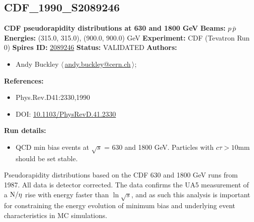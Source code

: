 \subsection[CDF\_1990\_S2089246]{CDF\_1990\_S2089246\,\cite{Abe:1989td}}
\textbf{CDF pseudorapidity distributions at 630 and 1800 GeV}\newline
\textbf{Beams:} $p$\,$\bar{p}$ \newline
\textbf{Energies:} (315.0, 315.0), (900.0, 900.0) GeV \newline
\textbf{Experiment:} CDF (Tevatron Run 0) \newline
\textbf{Spires ID:} \href{http://www.slac.stanford.edu/spires/find/hep/www?rawcmd=key+2089246}{2089246}\newline
\textbf{Status:} VALIDATED\newline
\textbf{Authors:}
\begin{itemize}
  \item Andy Buckley $\langle\,$\href{mailto:andy.buckley@cern.ch}{andy.buckley@cern.ch}$\,\rangle$;
\end{itemize}
\textbf{References:}
\begin{itemize}
  \item Phys.Rev.D41:2330,1990
  \item DOI: \href{http://dx.doi.org/10.1103/PhysRevD.41.2330}{10.1103/PhysRevD.41.2330}
\end{itemize}
\textbf{Run details:}
\begin{itemize}

  \item QCD min bias events at \ensuremath{\sqrt{s}} = 630 and 1800 GeV. Particles with $c \tau > 10$mm should be set stable.\end{itemize}

\noindent Pseudorapidity distributions based on the CDF 630 and 1800 GeV runs from 1987. All data is detector corrected. The data confirms the UA5 measurement of a $\d{N}/\d{\eta}$ rise with energy faster than $\ln{\sqrt{s}}$, and as such this analysis is important for constraining the energy evolution of minimum bias and underlying event characteristics in MC simulations.

\clearpage


\clearpage

